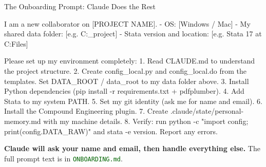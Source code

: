 \documentclass[aspectratio=169,11pt,dvipsnames]{beamer}
\newcommand{\file}[1]{\textcolor{darkgreen}{\nolinkurl{#1}}}
\begin{document}
\begin{frame}[fragile]{The Onboarding Prompt: Claude Does the Rest}
  \begin{codebox}[title=Paste into Claude Code -- fill in the three bracketed fields]
I am a new collaborator on [PROJECT NAME].
- OS: [Windows / Mac]
- My shared data folder: [e.g. C:\Users\YourName\Dropbox\your_project\data]
- Stata version and location: [e.g. Stata 17 at C:\Program Files]

Please set up my environment completely:
1. Read CLAUDE.md to understand the project structure.
2. Create config_local.py and config_local.do from the templates.
   Set DATA_ROOT / data_root to my data folder above.
3. Install Python dependencies (pip install -r requirements.txt + pdfplumber).
4. Add Stata to my system PATH.
5. Set my git identity (ask me for name and email).
6. Install the Compound Engineering plugin.
7. Create .claude/state/personal-memory.md with my machine details.
8. Verify: run python -c "import config; print(config.DATA_RAW)"
   and stata -e version. Report any errors.
  \end{codebox}
  \vspace{0.1cm}
  \small \textbf{Claude will ask your name and email, then handle everything else.}
  The full prompt text is in \file{ONBOARDING.md}.
\end{frame}
\end{document}
